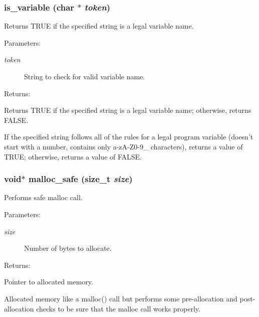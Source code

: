 \subsubsection{ is\_\-variable (char $\ast$ {\em token})}\label{util_8h_a3}


Returns TRUE if the specified string is a legal variable name.

\begin{Desc}
\item[Parameters: ]\par
\begin{description}
\item[{\em 
token}]String to check for valid variable name. \end{description}
\end{Desc}
\begin{Desc}
\item[Returns: ]\par
Returns TRUE if the specified string is a legal variable name; otherwise, returns FALSE.\end{Desc}
If the specified string follows all of the rules for a legal program variable (doesn't start with a number, contains only a-z\-A-Z0-9\_\- characters), returns a value of TRUE; otherwise, returns a value of FALSE. 
\subsubsection{\setlength{\rightskip}{0pt plus 5cm}void$\ast$ malloc\_\-safe (size\_\-t {\em size})}\label{util_8h_a12}


Performs safe malloc call.

\begin{Desc}
\item[Parameters: ]\par
\begin{description}
\item[{\em 
size}]Number of bytes to allocate.\end{description}
\end{Desc}
\begin{Desc}
\item[Returns: ]\par
Pointer to allocated memory.\end{Desc}
Allocated memory like a malloc() call but performs some pre-allocation and post-allocation checks to be sure that the malloc call works properly. 
